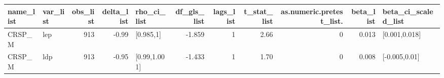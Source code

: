 \begin{table}[ht]
\centering
\begin{tabular}{llrrlrrrrrl}
  \hline
name\_list & var\_list & obs\_list & delta\_list & rho\_ci\_list & df\_gls\_list & lags\_list & t\_stat\_list & as.numeric.pretest\_list. & beta\_list & beta\_ci\_scaled\_list \\ 
  \hline
CRSP\_M & lep & 913 & -0.99 & [0.985,1] & -1.859 & 1 & 2.66 & 0 & 0.013 & [0.001,0.018] \\ 
  CRSP\_M & ldp & 913 & -0.95 & [0.99,1.001] & -1.433 & 1 & 1.70 & 0 & 0.008 & [-0.005,0.01] \\ 
   \hline
\end{tabular}
\end{table}

